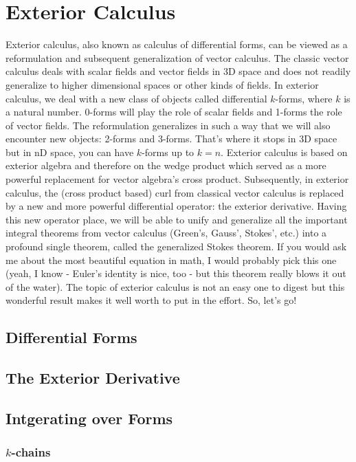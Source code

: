 \section{Exterior Calculus} 
Exterior calculus, also known as calculus of differential forms, can be viewed as a reformulation and subsequent generalization of vector calculus. The classic vector calculus deals with scalar fields and vector fields in 3D space and does not readily generalize to higher dimensional spaces or other kinds of fields. In exterior calculus, we deal with a new class of objects called differential $k$-forms, where $k$ is a natural number. 0-forms will play the role of scalar fields and 1-forms the role of vector fields. The reformulation generalizes in such a way that we will also encounter new objects: 2-forms and 3-forms. That's where it stops in 3D space but in nD space, you can have $k$-forms up to $k=n$. Exterior calculus is based on exterior algebra and therefore on the wedge product which served as a more powerful replacement for vector algebra's cross product. Subsequently, in exterior calculus, the (cross product based) curl from classical vector calculus is replaced by a new and more powerful differential operator: the exterior derivative. Having this new operator place, we will be able to unify and generalize all the important integral theorems from vector calculus (Green's, Gauss', Stokes', etc.) into a profound single theorem, called the generalized Stokes theorem. If you would ask me about the most beautiful equation in math, I would probably pick this one (yeah, I know - Euler's identity is nice, too - but this theorem really blows it out of the water). The topic of exterior calculus is not an easy one to digest but this wonderful result makes it well worth to put in the effort. So, let's go!
 
\subsection{Differential Forms} 

\subsection{The Exterior Derivative}

\subsection{Intgerating over Forms}

\subsubsection{$k$-chains}




